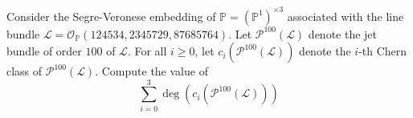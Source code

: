 Consider the Segre-Veronese embedding of $\mathbb{P}=(\mathbb{P}^1)^{\times 3}$ associated with the line bundle $\mathcal{L}=\mathcal{O}_{\mathbb{P}}(124534,2345729,87685764)$. Let $\mathcal{P}^{100}(\mathcal{L})$ denote the jet bundle of order $100$ of $\mathcal{L}$. For all $i\ge 0$, let $c_i(\mathcal{P}^{100}(\mathcal{L}))$ denote the $i$-th Chern class of $\mathcal{P}^{100}(\mathcal{L})$. Compute the value of
\[
    \sum_{i=0}^3\deg(c_i(\mathcal{P}^{100}(\mathcal{L})))
\]
